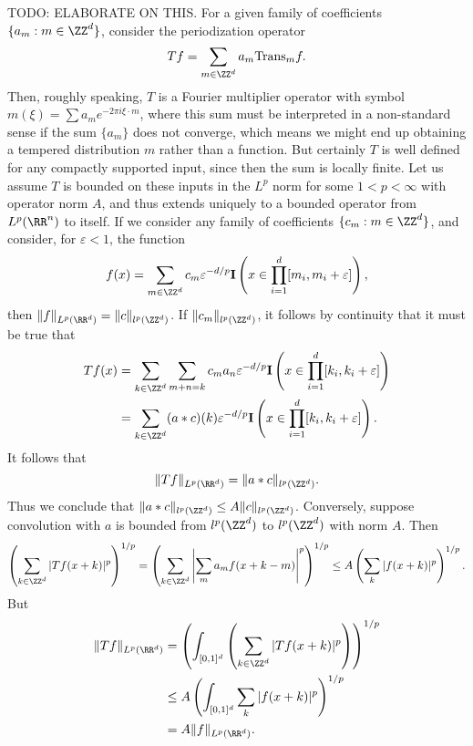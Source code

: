 \begin{example}
    TODO: ELABORATE ON THIS. For a given family of coefficients $\{ a_m : m \in \ZZ^d \}$, consider the periodization operator
    \[ Tf = \sum_{m \in \ZZ^d} a_m \text{Trans}_m f. \]
    Then, roughly speaking, $T$ is a Fourier multiplier operator with symbol $m(\xi) = \sum a_m e^{-2 \pi i \xi \cdot m}$, where this sum must be interpreted in a non-standard sense if the sum $\{ a_m \}$ does not converge, which means we might end up obtaining a tempered distribution $m$ rather than a function. But certainly $T$ is well defined for  any compactly supported input, since then the sum is locally finite. Let us assume $T$ is bounded on these inputs in the $L^p$ norm for some $1 < p < \infty$ with operator norm $A$, and thus extends uniquely to a bounded operator from $L^p(\RR^n)$ to itself. If we consider any family of coefficients $\{ c_m : m \in \ZZ^d \}$, and consider, for $\varepsilon < 1$, the function
    \[ f(x) = \sum_{m \in \ZZ^d} c_m \varepsilon^{-d/p} \mathbf{I} \left(x \in \prod_{i = 1}^d [m_i, m_i + \varepsilon] \right), \]
    then $\| f \|_{L^p(\RR^d)} = \| c \|_{l^p(\ZZ^d)}$. If $\| c_m \|_{l^p(\ZZ^d)}$, it follows by continuity that it must be true that
    \begin{align*}
        Tf(x) &= \sum_{k \in \ZZ^d} \sum_{m + n = k} c_m a_n \varepsilon^{-d/p} \mathbf{I} \left( x \in \prod_{i = 1}^d [k_i, k_i + \varepsilon] \right)\\
        &= \sum_{k \in \ZZ^d} (a * c)(k) \varepsilon^{-d/p} \mathbf{I} \left( x \in \prod_{i = 1}^d [k_i, k_i + \varepsilon] \right).
    \end{align*}
    It follows that
    \[ \| Tf \|_{L^p(\RR^d)} = \| a * c \|_{l^p(\ZZ^d)}. \]
    Thus we conclude that $\| a * c \|_{l^p(\ZZ^d)} \leq A \| c \|_{l^p(\ZZ^d)}$. Conversely, suppose convolution with $a$ is bounded from $l^p(\ZZ^d)$ to $l^p(\ZZ^d)$ with norm $A$. Then
    \[ \left( \sum_{k \in \ZZ^d} |Tf(x+k)|^p \right)^{1/p} = \left( \sum_{k \in \ZZ^d} \left| \sum_m a_m f(x + k - m) \right|^p \right)^{1/p} \leq A \left( \sum_k |f(x + k)|^p \right)^{1/p}. \]
    But
    \begin{align*}
        \| Tf \|_{L^p(\RR^d)} &= \left( \int_{[0,1]^d} \left( \sum_{k \in \ZZ^d} |Tf(x+k)|^p \right) \right)^{1/p}\\
        &\leq A \left( \int_{[0,1]^d} \sum_k |f(x+k)|^p \right)^{1/p}\\
        &= A \| f \|_{L^p(\RR^d)}.
    \end{align*}

\end{example}
